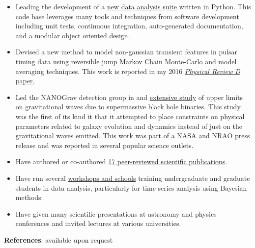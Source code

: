 \documentclass[11pt,letterpaper,sans]{moderncv} %
\begin{document}
\begin{itemize}

\item Leading the development of a \textcolor{cyan}{\href{https://github.com/nanograv/enterprise}{new data analysis suite}} written in Python. This code base leverages many tools and techniques from software development including unit tests, continuous integration, auto-generated documentation, and a modular object oriented design.
\vspace{6pt}

\item Devised a new method to model non-gaussian transient features in pulsar timing data using reversible jump Markov Chain Monte-Carlo and model averaging techniques. This work is reported in my 2016 \textcolor{cyan}{\href{http://adsabs.harvard.edu/abs/2016PhRvD..93h4048E}{\emph{Physical Review D} paper.}} \vspace{6pt}


\item Led the NANOGrav detection group in and \textcolor{cyan}{\href{http://adsabs.harvard.edu/abs/2016ApJ...821...13A}{extensive study}} of upper limits on gravitational waves due to supermassive black hole binaries. This study was the first of its kind it that it attempted to place constraints on physical parameters related to galaxy evolution and dynamics instead of just on the gravitational waves emitted. This work was part of a NASA and NRAO press release and was reported in several popular science outlets.
\vspace{6pt}

\item Have authored or co-authored \textcolor{cyan}{\href{https://jellis18.github.io/publication/}{17 peer-reviewed scientific publications}}.\vspace{6pt}

\item Have run several \textcolor{cyan}{\href{https://github.com/nanograv/pulsar_timing_school}{workshops and schools}} training undergraduate and graduate students in data analysis, particularly for time series analysis using Bayesian methods.
\vspace{6pt}

\item Have given many scientific presentations at astronomy and physics conferences and invited lectures at various universities. 

\end{itemize}

\vspace{15pt}
{\Large\textbf{References}:} available upon request
\end{document}

